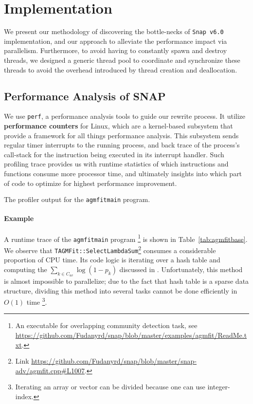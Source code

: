 \section{Implementation} \label{sec:impl}

\par We present our methodology of discovering the bottle-necks of 
\texttt{Snap v6.0} implementation, and our approach to alleviate the performance
impact via parallelism. Furthermore, to avoid having to constantly spawn and
destroy threads, we designed a generic thread pool to coordinate and 
synchronize these threads to avoid the overhead introduced by thread creation
and deallocation.


\subsection{Performance Analysis of \textbf{SNAP}}


\par We use \texttt{perf}\citep{linux-perf}, a performance analysis tools to 
guide our rewrite process. It utilize \textbf{performance counters} for Linux,
which are a kernel-based subsystem that provide a framework for all things 
performance analysis. This subsystem sends regular timer interrupts to the
running process, and back trace of the process's call-stack for the instruction
being executed in its interrupt handler. Such profiling trace provides us with 
runtime statistics of which instructions and functions consume more processor 
time, and ultimately insights
into which part of code to optimize for highest performance improvement.

\begin{table}
    \centering
    \caption{The profiler output for the \texttt{agmfitmain} program.}
    \label{tab:agmfitbase}
\end{table}

\paragraph{Example} A runtime trace of the \texttt{agmfitmain} program
\footnote{An executable for overlapping community detection task, see 
\url{https://github.com/Fudanyrd/snap/blob/master/examples/agmfit/ReadMe.txt}.}
is shown in Table~\ref{tab:agmfitbase}. We observe that 
\texttt{TAGMFit::SelectLambdaSum}\footnote{Link \url{https://github.com/Fudanyrd/snap/blob/master/snap-adv/agmfit.cpp\#L1007}.}
consumes a considerable proportion of CPU time.
Its code logic is iterating over a hash table and computing the 
$\sum_{k\in C_{uv}} \log (1-p_{k})$ discussed in \citep{yang2012structure}.
Unfortunately, this method is almost impossible to parallelize; due to the
fact that hash table is a sparse data structure, dividing this method into 
several tasks cannot be done efficiently in $O(1)$ time
\footnote{Iterating an array or vector can be divided because one can use integer-index.}.

